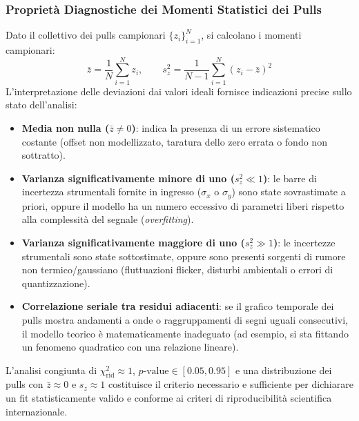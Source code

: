 \documentclass[11pt,a4paper]{article}
\begin{document}
\subsubsection{Proprietà Diagnostiche dei Momenti Statistici dei Pulls}
Dato il collettivo dei pulls campionari $\{z_i\}_{i=1}^N$, si calcolano i momenti campionari:
\begin{equation}
    \bar{z} = \frac{1}{N} \sum_{i=1}^N z_i, \qquad s_z^2 = \frac{1}{N - 1} \sum_{i=1}^N (z_i - \bar{z})^2
\end{equation}
L'interpretazione delle deviazioni dai valori ideali fornisce indicazioni precise sullo stato dell'analisi:
\begin{itemize}
    \item \textbf{Media non nulla ($\bar{z} \neq 0$)}: indica la presenza di un errore sistematico costante (offset non modellizzato, taratura dello zero errata o fondo non sottratto).
    \item \textbf{Varianza significativamente minore di uno ($s_z^2 \ll 1$)}: le barre di incertezza strumentali fornite in ingresso ($\sigma_x$ o $\sigma_y$) sono state sovrastimate a priori, oppure il modello ha un numero eccessivo di parametri liberi rispetto alla complessità del segnale (\emph{overfitting}).
    \item \textbf{Varianza significativamente maggiore di uno ($s_z^2 \gg 1$)}: le incertezze strumentali sono state sottostimate, oppure sono presenti sorgenti di rumore non termico/gaussiano (fluttuazioni flicker, disturbi ambientali o errori di quantizzazione).
    \item \textbf{Correlazione seriale tra residui adiacenti}: se il grafico temporale dei pulls mostra andamenti a onde o raggruppamenti di segni uguali consecutivi, il modello teorico è matematicamente inadeguato (ad esempio, si sta fittando un fenomeno quadratico con una relazione lineare).
\end{itemize}

L'analisi congiunta di $\chi^2_{\text{rid}} \approx 1$, $p\text{-value} \in [0.05, 0.95]$ e una distribuzione dei pulls con $\bar{z} \approx 0$ e $s_z \approx 1$ costituisce il criterio necessario e sufficiente per dichiarare un fit statisticamente valido e conforme ai criteri di riproducibilità scientifica internazionale.
\end{document}
